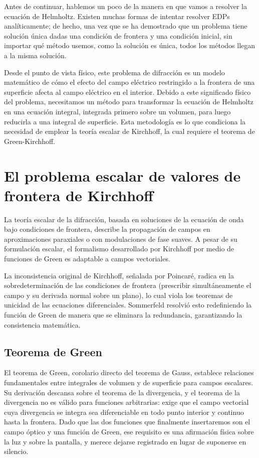 	Antes de continuar, hablemos un poco de la manera en que vamos a resolver la ecuación de Helmholtz. Existen muchas formas de intentar resolver EDPs analíticamente; de hecho, una vez que se ha demostrado que un problema tiene solución única dadas una condición de frontera y una condición inicial, sin importar qué método usemos, como la solución es única, todos los métodos llegan a la misma solución.

	Desde el punto de vista físico, este problema de difracción es un modelo matemático de cómo el efecto del campo eléctrico restringido a la frontera de una superficie afecta al campo eléctrico en el interior. Debido a este significado físico del problema, necesitamos un método para transformar la ecuación de Helmholtz en una ecuación integral, integrada primero sobre un volumen, para luego reducirla a una integral de superficie. Esta metodología es lo que condiciona la necesidad de emplear la teoría escalar de Kirchhoff, la cual requiere el teorema de Green-Kirchhoff.

\section{El problema escalar de valores de frontera de Kirchhoff}

	La teoría escalar de la difracción, basada en soluciones de la ecuación de onda bajo condiciones de frontera, describe la propagación de campos en aproximaciones paraxiales o con modulaciones de fase suaves. A pesar de su formulación escalar, el formalismo desarrollado por Kirchhoff por medio de funciones de Green es adaptable a campos vectoriales.

	La inconsistencia original de Kirchhoff, señalada por Poincaré, radica en la sobredeterminación de las condiciones de frontera (prescribir simultáneamente el campo y su derivada normal sobre un plano), lo cual viola los teoremas de unicidad de las ecuaciones diferenciales. Sommerfeld resolvió esto redefiniendo la función de Green de manera que se eliminara la redundancia, garantizando la consistencia matemática.

	\subsection{Teorema de Green}

		El teorema de Green, corolario directo del teorema de Gauss, establece relaciones fundamentales entre integrales de volumen y de superficie para campos escalares. Su derivación descansa sobre el teorema de la divergencia, y el teorema de la divergencia no es válido para funciones arbitrarias: exige que el campo vectorial cuya divergencia se integra sea diferenciable en todo punto interior y continuo hasta la frontera. Dado que las dos funciones que finalmente insertaremos son el campo óptico y una función de Green, ese requisito es una afirmación física sobre la luz y sobre la pantalla, y merece dejarse registrado en lugar de suponerse en silencio.

